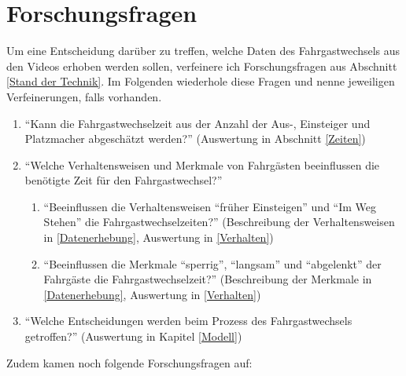 \chapter{Forschungsfragen} \label{Forschungsfragen}
Um eine Entscheidung darüber zu treffen, welche Daten des Fahrgastwechsels aus den Videos erhoben werden sollen, verfeinere ich Forschungsfragen aus Abschnitt \ref{Stand der Technik}. Im Folgenden wiederhole diese Fragen und nenne jeweiligen Verfeinerungen, falls vorhanden.
\begin{enumerate}
 \item "`Kann die Fahrgastwechselzeit aus der Anzahl der Aus-, Einsteiger und Platzmacher abgeschätzt werden?"' (Auswertung in Abschnitt \ref{Zeiten}) \label{item:Fahrgastwechselzeiten}
 \item "`Welche Verhaltensweisen und Merkmale von Fahrgästen beeinflussen die benötigte Zeit für den Fahrgastwechsel?"' \label{item:Verhalten}
 	\begin{enumerate}
 		\item "`Beeinflussen die Verhaltensweisen "`früher Einsteigen"' und "`Im Weg Stehen"' die Fahrgastwechselzeiten?"' (Beschreibung der Verhaltensweisen in \ref{Datenerhebung}, Auswertung in \ref{Verhalten}) \label{item:Verhalten,Verhalten}
 		\item "`Beeinflussen die Merkmale "`sperrig"', "`langsam"' und "`abgelenkt"' der Fahrgäste die Fahrgastwechselzeit?"' (Beschreibung der Merkmale in \ref{Datenerhebung}, Auswertung in \ref{Verhalten}) \label{item:Vehalten,Merkmale}
 	\end{enumerate}
 \item "`Welche Entscheidungen werden beim Prozess des Fahrgastwechsels getroffen?"' (Auswertung in Kapitel \ref{Modell}) \label{item:Entscheidungen}
\end{enumerate}
Zudem kamen noch folgende Forschungsfragen auf:
